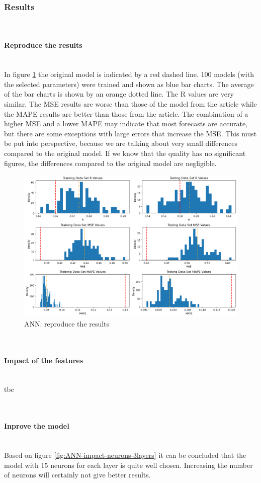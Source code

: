 \documentclass{article}
\newcommand{\subsubsubsection}[1]{%
  \paragraph{#1}\mbox{}\\}
\begin{document}
\subsubsection{Results}

\subsubsubsection{Reproduce the results}

In figure \ref{fig:ANN-reproduce-the-results} the original model is indicated by a red dashed line. 100 models (with the selected parameters) were trained and shown as blue bar charts. The average of the bar charts is shown by an orange dotted line.
The R values are very similar. The MSE results are worse than those of the model from the article while the MAPE results are better than those from the article.
The combination of a higher MSE and a lower MAPE may indicate that most forecasts are accurate, but there are some exceptions with large errors that increase the MSE.
This must be put into perspective, because we are talking about very small differences compared to the original model. If we know that the quality has no significant figures, the differences compared to the original model are negligible.

\begin{figure}
	\centering
	\includegraphics[width=\linewidth]{figures/ANN_reproduce_the_results.png}
	\caption{ANN: reproduce the results}
	\label{fig:ANN-reproduce-the-results}
\end{figure}


\subsubsubsection{Impact of the features}
tbc

\subsubsubsection{Inprove the model}
Based on figure \ref{fig:ANN-impact-neurons-3layers} it can be concluded that the model with 15 neurons for each layer is quite well chosen. Increasing the number of neurons will certainly not give better results.
\end{document}

